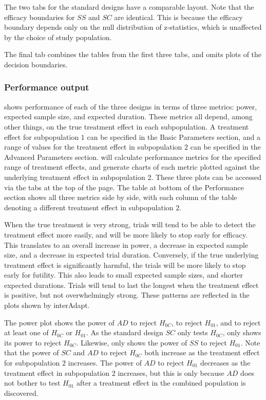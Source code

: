 \documentclass[article]{jss}
\begin{document}
The two tabs for the standard designs have a comparable layout. Note that the efficacy boundaries for $SS$ and $SC$ are identical. This is because the efficacy boundary depends only on the null distribution of z-statistics, which is unaffected by the choice of study population.

The final tab combines the tables from the first three tabs, and omits plots of the decision boundaries.


\subsubsection{Performance output}
\label{sub:performance-output}

 shows performance of each of the three designs in terms of three metrics: power, expected sample size, and expected duration. These metrics all depend, among other things, on the true treatment effect in each subpopulation. A treatment effect for subpopulation $1$ can be specified in the Basic Parameters section, and a range of values for the treatment effect in subpopulation $2$ can be specified in the Advanced Parameters section.  will calculate performance metrics for the specified range of treatment effects, and generate charts of each metric plotted against the underlying treatment effect in subpopulation $2$. These three plots can be accessed via the tabs at the top of the page. The table at bottom of the Performance section shows all three metrics side by side, with each column of the table denoting a different treatment effect in subpopulation $2$.

When the true treatment is very strong, trials will tend to be able to detect the treatment effect more easily, and will be more likely to stop early for efficacy. This translates to an overall increase in power, a decrease in expected sample size, and a decrease in expected trial duration. Conversely, if the true underlying treatment effect is significantly harmful, the trials will be more likely to stop early for futility. This also leads to small expected sample sizes, and shorter expected durations. Trials will tend to last the longest when the treatment effect is positive, but not overwhelmingly strong. These patterns are reflected in the plots shown by \textsf{interAdapt}.

The power plot shows the power of $AD$ to reject $H_{0C}$, to reject $H_{01}$, and to reject at least one of $H_{0C}$ or $H_{01}$. As the standard design $SC$ only tests $H_{0C}$,  only shows its power to reject $H_{0C}$. Likewise,  only shows the power of $SS$ to reject $H_{01}$. Note that the power of $SC$ and $AD$ to reject $H_{0C}$ both increase as the treatment effect for subpopulation $2$ increases. The power of $AD$ to reject $H_{01}$ decreases as the treatment effect in subpopulation $2$ increases, but this is only because $AD$ does not bother to test $H_{01}$ after a treatment effect in the combined population is discovered.
\end{document}
